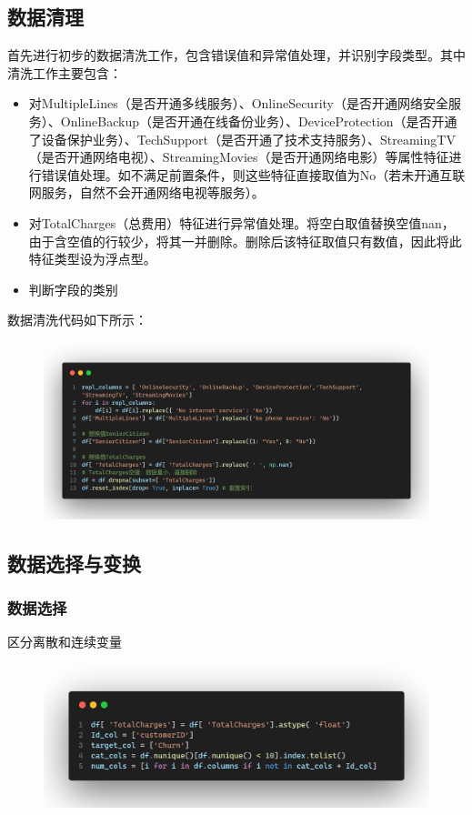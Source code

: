 \documentclass{article}
\begin{document}
\subsection{数据清理}
首先进行初步的数据清洗工作，包含错误值和异常值处理，并识别字段类型。其中清洗工作主要包含：
\begin{itemize}
	\item 对MultipleLines（是否开通多线服务）、OnlineSecurity（是否开通网络安全服务）、OnlineBackup（是否开通在线备份业务）、DeviceProtection（是否开通了设备保护业务）、TechSupport（是否开通了技术支持服务）、StreamingTV（是否开通网络电视）、StreamingMovies（是否开通网络电影）等属性特征进行错误值处理。如不满足前置条件，则这些特征直接取值为No（若未开通互联网服务，自然不会开通网络电视等服务）。
	\item 对TotalCharges（总费用）特征进行异常值处理。将空白取值替换空值nan，由于含空值的行较少，将其一并删除。删除后该特征取值只有数值，因此将此特征类型设为浮点型。
	\item 判断字段的类别
\end{itemize}
数据清洗代码如下所示：
\begin{figure}[H]
	\centering
	\includegraphics[width=\textwidth]{./img/data_clean.png}
\end{figure}

\subsection{数据选择与变换}
\subsubsection{数据选择}
区分离散和连续变量

\begin{figure}[H]
	\centering
	\includegraphics[width=\textwidth]{./img/data_select.png}
\end{figure}
\end{document}

